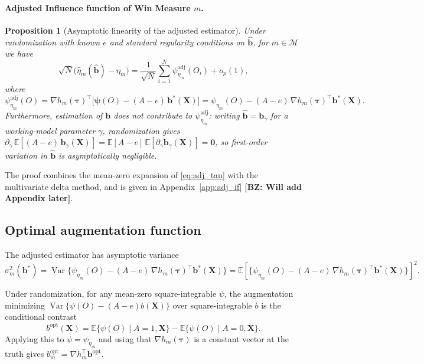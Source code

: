 \documentclass[11pt,a4paper]{article}
\newtheorem{proposition}{Proposition}
\newcommand{\E}{\mathbb{E}}
\newcommand{\Var}{\operatorname{Var}}
\begin{document}
\paragraph{Adjusted Influence function of Win Measure $m$.}
\begin{proposition}[Asymptotic linearity of the adjusted estimator]
\label{prop:adj_if}
Under randomization with known $e$ and standard regularity conditions on
$\hat{\boldsymbol b}$, for $m\in \mathcal{M}$ we have 
\[
   \sqrt N\bigl(\hat\eta_m(\hat{\boldsymbol b})-\eta_m\bigr)
   =\frac1{\sqrt N}\sum_{i=1}^N\psi^{\mathrm{adj}}_{\eta_m}(O_i)+o_p(1),
\]
where
\[
   \psi^{\mathrm{adj}}_{\eta_m}(O)
   =\nabla h_m(\boldsymbol\tau)^\top\bigl[\boldsymbol\psi(O)-(A-e)\,\boldsymbol b^\ast(\mathbf{X})\bigr]
   =\psi_{\eta_m}(O)-(A-e)\,\nabla h_m(\boldsymbol\tau)^\top\boldsymbol b^\ast(\mathbf{X}).
\]
Furthermore, estimation of $\boldsymbol b$ does not contribute to
$\psi^{\mathrm{adj}}_{\eta_m}$: writing $\hat{\boldsymbol b}=\boldsymbol b_{\hat\gamma}$ for
a working-model parameter $\gamma$, randomization gives
$\partial_\gamma\,\E[(A-e)\,\boldsymbol b_\gamma(\mathbf{X})]
=\E[A-e]\,\E[\partial_\gamma\boldsymbol b_\gamma(\mathbf{X})]=\boldsymbol 0$,
so first-order variation in $\hat{\boldsymbol b}$ is asymptotically negligible.
\end{proposition}
The proof combines the mean-zero expansion of \eqref{eq:adj_tau} with the multivariate
delta method, and is given in Appendix~\ref{app:adj_if} \textbf{[BZ: Will add Appendix later]}.

\subsection{Optimal augmentation function}

The adjusted estimator has asymptotic variance
\begin{equation}\label{eq:Varb}
    \sigma_m^2(\boldsymbol b^\ast)
    =\Var\{\psi_{\eta_m}(O)-(A-e)\,\nabla h_m(\boldsymbol\tau)^\top\boldsymbol b^\ast(\mathbf X)\} = \E[\{\psi_{\eta_m}(O)-(A-e)\,\nabla h_m(\boldsymbol\tau)^\top\boldsymbol b^\ast(\mathbf X)\}]^2.
\end{equation}


Under randomization, for any mean-zero square-integrable $\psi$, the augmentation
minimizing $\Var\{\psi(O)-(A-e)b(\mathbf X)\}$ over square-integrable $b$ is the
conditional contrast \citep{tsiatis2008covariate, zhang2008improving, zhang2025unified}
\[
   b^{\mathrm{opt}}(\mathbf X)
   =\E\{\psi(O)\mid A=1,\mathbf X\}-\E\{\psi(O)\mid A=0,\mathbf X\}.
\]
Applying this to $\psi=\psi_{\eta_m}$ and using that $\nabla h_m(\boldsymbol\tau)$ is a
constant vector at the truth gives
$b_m^{\mathrm{opt}}=\nabla h_m^\top\boldsymbol b^{\mathrm{opt}}$. 
\end{document}
